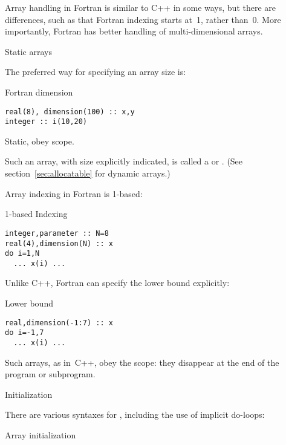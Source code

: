 
Array handling in Fortran is similar to C++ in some ways, but there
are differences, such as that  Fortran indexing starts at~1, rather
than~0. More importantly, Fortran has better handling of
multi-dimensional arrays.

 {Static arrays}

The preferred way for specifying an array size is:

\begin{block}{Fortran dimension}
  \label{sl:farray-dimension}
\begin{verbatim}
real(8), dimension(100) :: x,y
integer :: i(10,20)
\end{verbatim}
  Static, obey scope.
\end{block}

Such an array, with size explicitly indicated, is called a
 or .
(See section~\ref{sec:allocatable} for
dynamic arrays.)

Array indexing in Fortran is 1-based:
\begin{block}{1-based Indexing}
  \label{sl:farray-base1}
\begin{verbatim}
integer,parameter :: N=8
real(4),dimension(N) :: x
do i=1,N
  ... x(i) ...
\end{verbatim}
\end{block}

Unlike C++, Fortran can specify the lower bound explicitly:
\begin{block}{Lower bound}
  \label{sl:farray-lower}
\begin{verbatim}
real,dimension(-1:7) :: x
do i=-1,7
  ... x(i) ...
\end{verbatim}
\end{block}

Such arrays, as in~C++, obey the scope: they disappear at the end of
the program or subprogram.

 {Initialization}

There are various syntaxes for ,
including the use of implicit do-loops:
\begin{block}{Array initialization}
  \label{sl:farray-init}
\end{block}

